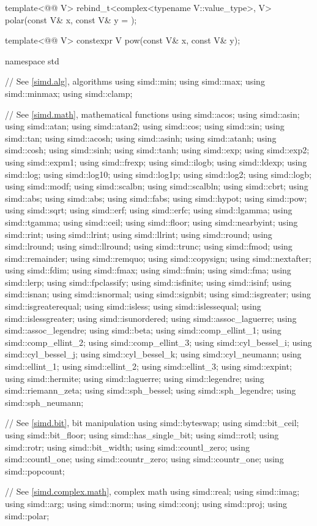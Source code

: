 \begin{codeblock}
{  template<@@ V>
    rebind_t<complex<typename V::value_type>, V> polar(const V& x, const V& y = {});

  template<@@ V> constexpr V pow(const V& x, const V& y);
}

namespace std {
  // See \ref{simd.alg}, algorithms
  using simd::min;
  using simd::max;
  using simd::minmax;
  using simd::clamp;

  // See \ref{simd.math}, mathematical functions
  using simd::acos;
  using simd::asin;
  using simd::atan;
  using simd::atan2;
  using simd::cos;
  using simd::sin;
  using simd::tan;
  using simd::acosh;
  using simd::asinh;
  using simd::atanh;
  using simd::cosh;
  using simd::sinh;
  using simd::tanh;
  using simd::exp;
  using simd::exp2;
  using simd::expm1;
  using simd::frexp;
  using simd::ilogb;
  using simd::ldexp;
  using simd::log;
  using simd::log10;
  using simd::log1p;
  using simd::log2;
  using simd::logb;
  using simd::modf;
  using simd::scalbn;
  using simd::scalbln;
  using simd::cbrt;
  using simd::abs;
  using simd::abs;
  using simd::fabs;
  using simd::hypot;
  using simd::pow;
  using simd::sqrt;
  using simd::erf;
  using simd::erfc;
  using simd::lgamma;
  using simd::tgamma;
  using simd::ceil;
  using simd::floor;
  using simd::nearbyint;
  using simd::rint;
  using simd::lrint;
  using simd::llrint;
  using simd::round;
  using simd::lround;
  using simd::llround;
  using simd::trunc;
  using simd::fmod;
  using simd::remainder;
  using simd::remquo;
  using simd::copysign;
  using simd::nextafter;
  using simd::fdim;
  using simd::fmax;
  using simd::fmin;
  using simd::fma;
  using simd::lerp;
  using simd::fpclassify;
  using simd::isfinite;
  using simd::isinf;
  using simd::isnan;
  using simd::isnormal;
  using simd::signbit;
  using simd::isgreater;
  using simd::isgreaterequal;
  using simd::isless;
  using simd::islessequal;
  using simd::islessgreater;
  using simd::isunordered;
  using simd::assoc_laguerre;
  using simd::assoc_legendre;
  using simd::beta;
  using simd::comp_ellint_1;
  using simd::comp_ellint_2;
  using simd::comp_ellint_3;
  using simd::cyl_bessel_i;
  using simd::cyl_bessel_j;
  using simd::cyl_bessel_k;
  using simd::cyl_neumann;
  using simd::ellint_1;
  using simd::ellint_2;
  using simd::ellint_3;
  using simd::expint;
  using simd::hermite;
  using simd::laguerre;
  using simd::legendre;
  using simd::riemann_zeta;
  using simd::sph_bessel;
  using simd::sph_legendre;
  using simd::sph_neumann;

  // See \ref{simd.bit}, bit manipulation
  using simd::byteswap;
  using simd::bit_ceil;
  using simd::bit_floor;
  using simd::has_single_bit;
  using simd::rotl;
  using simd::rotr;
  using simd::bit_width;
  using simd::countl_zero;
  using simd::countl_one;
  using simd::countr_zero;
  using simd::countr_one;
  using simd::popcount;

  // See \ref{simd.complex.math},  complex math
  using simd::real;
  using simd::imag;
  using simd::arg;
  using simd::norm;
  using simd::conj;
  using simd::proj;
  using simd::polar;
}
\end{codeblock}

